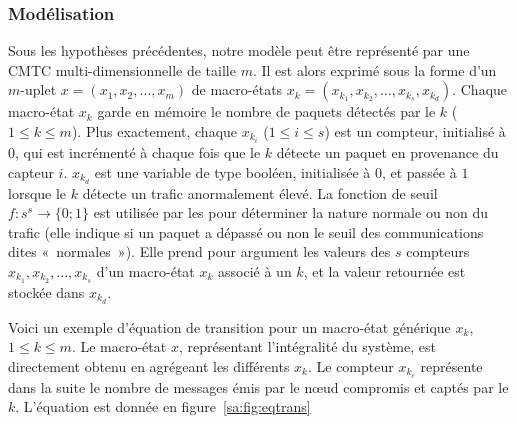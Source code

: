         \subsubsection{Modélisation}
Sous les hypothèses précédentes, notre modèle peut être représenté par une CMTC multi-dimensionnelle de taille $m$.
Il est alors exprimé sous la forme d'un $m$-uplet $x\!=\!(x_1,x_2,\dots,x_m)$ de macro-états $x_k\!=\!(x_{k_1},x_{k_2},\dots,x_{k_s},x_{k_d})$.
Chaque macro-état $x_k$    garde en mémoire le nombre de paquets détectés par le \cn $k$ ($1\leq k\leq m$).
Plus exactement, chaque $x_{k_i}$ ($1\leq i\leq s$) est un compteur, initialisé à $0$, qui est incrémenté à chaque fois que le \cn $k$ détecte un paquet en provenance du capteur $i$.
$x_{k_d}$ est une variable de type booléen, initialisée à $0$, et passée à $1$ lorsque le \cn $k$ détecte un trafic anormalement élevé.
La fonction de seuil $f:s^s\rightarrow\{0;1\}$ est utilisée par les \cns pour déterminer la nature normale ou non du trafic (elle indique si un paquet a dépassé ou non le seuil des communications dites «~normales~»).
Elle prend pour argument les valeurs des $s$ compteurs $x_{k_1},x_{k_2},\dots,x_{k_s}$ d'un macro-état $x_k$ associé à un \cn $k$, et la valeur retournée est stockée dans $x_{k_d}$.

Voici un exemple d'équation de transition pour un macro-état générique $x_k$, $1\leq k\leq m$.
Le macro-état $x$, représentant l'intégralité du système, est directement obtenu en agrégeant les différents $x_k$.
Le compteur $x_{k_c}$ représente dans la suite le nombre de messages émis par le nœud compromis et captés par le \cn $k$.
L'équation est donnée en figure~\ref{sa:fig:eqtrans}

\newlength{\fboxlinelen}
\setlength{\fboxlinelen}{\linewidth}
\addtolength{\fboxlinelen}{-4\fboxsep}
\addtolength{\fboxlinelen}{-2\fboxrule}

